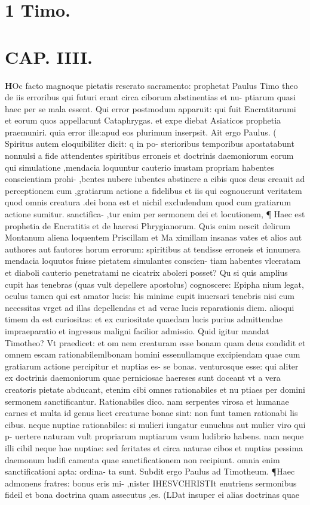 \documentclass{article}
\begin{document}
\begin{pages}
\section*{1 Timo. }
\marginpar{[ p.207 ]}
\endnumbering\beginnumbering\section{CAP. IIII.}\pstart \huge\textbf{H}\normalsize Oc facto magnoque pietatis reserato sacramento: prophetat Paulus Timo theo de iis erroribus qui futuri erant circa ciborum abstinentias et nu- ptiarum quasi haec per se mala essent. Qui error postmodum apparuit: qui fuit Encratitarumi et eorum quos appellarunt Cataphrygas. et expe diebat Asiaticos prophetia praemuniri. quia error ille:apud eos plurimum inserpsit. Ait ergo Paulus. ( Spiritus autem eloquibiliter dicit: q in po- sterioribus temporibus apostatabunt nonnulsi a fide attendentes spiritibus erroneis et doctrinis daemoniorum eorum qui simulatione ,mendacia loquuntur cauterio inustam propriam habentes conscientiam prohi- ,bentes nubere iubentes abstinere a cibis quos deus creauit ad perceptionem cum ,gratiarum actione a fidelibus et iis qui cognouerunt veritatem quod omnis creatura .dei bona est et nichil excludendum quod cum gratiarum actione sumitur. sanctifica- ,tur enim per sermonem dei et locutionem, ¶ Haec est prophetia de Encratitis et de haeresi Phrygianorum. Quis enim nescit delirum Montanum aliena loquentem Priscillam et Ma ximillam insanas vates et alios aut authores aut fautores horum errorum: spiritibus at tendisse erroneis et innumera mendacia loquutos fuisse pietatem simulantes conscien- tiam habentes vlceratam et diaboli cauterio penetratami ne cicatrix aboleri posset? Qu si quis amplius cupit has tenebras (quas vult depellere apostolus) cognoscere: Epipha nium legat, oculus tamen qui est amator lucis: his minime cupit inuersari tenebris nisi cum necessitas vrget ad illas depellendas et ad verae lucis reparationis diem. alioqui timem da est curiositas: et ex curiositate quaedam lucis purius admittendae impraeparatio et ingressus maligni facilior admissio. Quid igitur mandat Timotheo? Vt praedicet: et om nem creaturam esse bonam quam deus condidit et omnem escam rationabilemlbonam homini essenullamque excipiendam quae cum gratiarum actione percipitur et nuptias es- se bonas. venturosque esse: qui aliter ex doctrinis daemoniorum quae perniciosae haereses sunt doceant vt a vera creatoris pietate abducant, etenim cibi omnes rationabiles et nu ptiaes per domini sermonem sanctificantur. Rationabiles dico. nam serpentes virosa et humanae carnes et multa id genus licet creaturae bonae sint: non funt tamen rationabi lis cibus. neque nuptiae rationabiles: si mulieri iungatur eunuchus aut mulier viro qui p- uertere naturam vult propriarum nuptiarum vsum ludibrio habens. nam neque illi cibil neque hae nuptiae: sed feritates et circa naturae cibos et nuptias pessima daemonum ludifi camenta quae sanctificationem non recipiunt. omnia enim sanctificationi apta: ordina- ta sunt. Subdit ergo Paulus ad Timotheum. ¶Haec admonens fratres: bonus eris mi- ,nister IHESVCHRISTIt enutriens sermonibus fideil et bona doctrina quam assecutus ,es. (LDat insuper ei alias doctrinas quae 
\end{pages}
\end{document}

